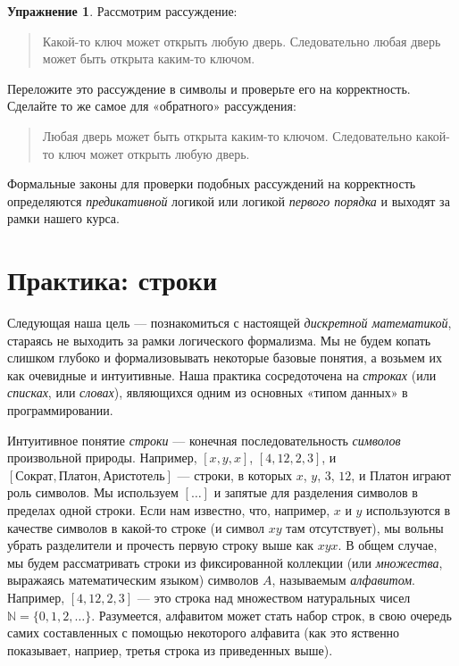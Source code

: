 \documentclass[12pt,notitlepage]{article}
\theoremstyle{plain}
\theoremstyle{definition}
\newtheorem{exc}[thm]{Упражнение}
\theoremstyle{plain}
\newcommand{\N}{\mathbb{N}}
\newcommand{\1}{\mathbf{1}}
\newcommand{\0}{\mathbf{0}}
\newcommand{\mcomm}[1]{}
\begin{document}
\begin{exc}
	Рассмотрим рассуждение:
	\begin{quote}
		Какой-то ключ может открыть любую дверь. Следовательно любая дверь может быть открыта каким-то ключом.
	\end{quote}
	Переложите это рассуждение в символы и проверьте его на корректность. Сделайте то же самое для «обратного» рассуждения:
	\begin{quote}
		Любая дверь может быть открыта каким-то ключом. Следовательно какой-то ключ может открыть любую дверь.
	\end{quote}
	
\end{exc}

Формальные законы для проверки подобных рассуждений на корректность определяются \emph{предикативной} логикой или логикой \emph{первого порядка} и выходят за рамки нашего курса.

\section{Практика: строки}\label{sect:strings}

\mcomm{}

Следующая наша цель --- познакомиться с настоящей \emph{дискретной математикой}, стараясь не выходить за рамки логического формализма. Мы не будем копать слишком глубоко и формализовывать некоторые базовые понятия, а возьмем их как очевидные и интуитивные. Наша практика сосредоточена на \emph{строках} (или \emph{списках}, или \emph{словах}), являющихся одним из основных «типом данных» в программировании.

Интуитивное понятие \emph{строки} --- конечная последовательность \emph{символов} произвольной природы. Например, $[x, y, x]$, $[4, 12, 2, 3]$, и $[\mbox{Сократ}, \mbox{Платон}, \mbox{Аристотель}]$ --- строки, в которых $x$, $y$, $3$, $12$, и $\mbox{Платон}$ играют роль символов. Мы используем $[\ldots]$ и запятые для разделения символов в пределах одной строки. Если нам известно, что, например, $x$ и $y$ используются в качестве символов в какой-то строке (и символ $xy$ там отсутствует), мы вольны убрать разделители и прочесть первую строку выше как $xyx$. В общем случае, мы будем рассматривать строки из фиксированной коллекции (или \emph{множества}, выражаясь математическим языком) символов $A$, называемым \emph{алфавитом}. Например, $[4, 12, 2, 3]$ --- это строка над множеством натуральных чисел $\N = \{0,1,2,\ldots\}$. Разумеется, алфавитом может стать набор строк, в свою очередь самих составленных с помощью некоторого алфавита (как это яственно показывает, наприер, третья строка из приведенных выше).
\end{document}
